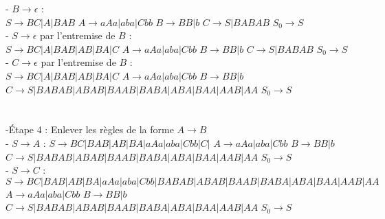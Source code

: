 \documentclass{article}
\begin{document}
- $B \rightarrow \epsilon$ :\\
\newline $S \rightarrow BC|A|BAB$
\newline $A \rightarrow aAa|aba|Cbb$
\newline $B \rightarrow BB|b$
\newline $C \rightarrow S|BABAB$
\newline $S_0 \rightarrow S$
\\

- $S \rightarrow \epsilon$ par l'entremise de $B$ :\\
\newline $S \rightarrow BC|A|BAB|AB|BA|C$
\newline $A \rightarrow aAa|aba|Cbb$
\newline $B \rightarrow BB|b$
\newline $C \rightarrow S|BABAB$
\newline $S_0 \rightarrow S$
\\

- $C \rightarrow \epsilon$ par l'entremise de $B$ :\\
\newline $S \rightarrow BC|A|BAB|AB|BA|C$
\newline $A \rightarrow aAa|aba|Cbb$
\newline $B \rightarrow BB|b$
\newline $C \rightarrow S|BABAB|ABAB|BAAB|BABA|ABA|BAA|AAB|AA$
\newline $S_0 \rightarrow S$
\\
\\
\\
-Étape 4 : Enlever les règles de la forme $A \rightarrow B$\\

- $S \rightarrow A$ :
\newline $S \rightarrow BC|BAB|AB|BA|aAa|aba|Cbb|C|$
\newline $A \rightarrow aAa|aba|Cbb$
\newline $B \rightarrow BB|b$
\newline $C \rightarrow S|BABAB|ABAB|BAAB|BABA|ABA|BAA|AAB|AA$
\newline $S_0 \rightarrow S$
\\

- $S \rightarrow C$ :
\newline $S \rightarrow BC|BAB|AB|BA|aAa|aba|Cbb|BABAB|ABAB|BAAB|BABA|ABA|BAA|AAB|AA$
\newline $A \rightarrow aAa|aba|Cbb$
\newline $B \rightarrow BB|b$
\newline $C \rightarrow S|BABAB|ABAB|BAAB|BABA|ABA|BAA|AAB|AA$
\newline $S_0 \rightarrow S$
\\
\end{document}
